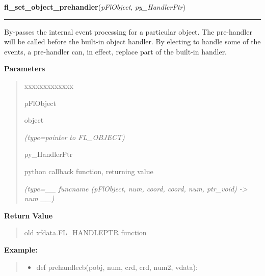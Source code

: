 \hspace{.8\funcindent}\begin{boxedminipage}{\funcwidth}

    \raggedright \textbf{fl\_set\_object\_prehandler}(\textit{pFlObject}, \textit{py\_HandlerPtr})

    \vspace{-1.5ex}

    \rule{\textwidth}{0.5\fboxrule}
\setlength{\parskip}{2ex}
    By-passes the internal event processing for a particular object. The 
    pre-handler will be called before the built-in object handler. By 
    electing to handle some of the events, a pre-handler can, in effect, 
    replace part of the built-in handler.

\setlength{\parskip}{1ex}
      \textbf{Parameters}
      \vspace{-1ex}

      \begin{quote}
        \begin{Ventry}{xxxxxxxxxxxxx}

          \item[pFlObject]

          object

            {\it (type=pointer to FL\_OBJECT)}

          \item[py\_HandlerPtr]

          python callback function, returning value

            {\it (type=\_\_ funcname (pFlObject, num, coord, coord, num, ptr\_void) 
-{\textgreater} num \_\_)}

        \end{Ventry}

      \end{quote}

      \textbf{Return Value}
    \vspace{-1ex}

      \begin{quote}
      old xfdata.FL\_HANDLEPTR function

      \end{quote}

\textbf{Example:}
\begin{quote}
  \begin{itemize}

  \item
    \setlength{\parskip}{0.6ex}
def prehandlecb(pobj, num, crd, crd, num2, vdata):




\end{itemize}
\end{quote}
\end{boxedminipage}
